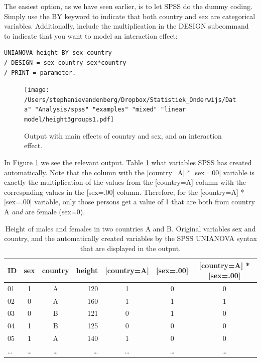 \documentclass[]{report}\usepackage[]{graphicx}\usepackage[]{color}
\begin{document}
The easiest option, as we have seen earlier, is to let SPSS do the dummy coding. Simply use the BY keyword to indicate that both country and sex are categorical variables. Additionally, include the multiplication in the DESIGN subcommand to indicate that you want to model an interaction effect:

\begin{verbatim}
UNIANOVA height BY sex country 
/ DESIGN = sex country sex*country
/ PRINT = parameter.
\end{verbatim}


\begin{figure}[h]
    \begin{center}
       \texttt{[image: /Users/stephanievandenberg/Dropbox/Statistiek\_Onderwijs/Data" "Analysis/spss" "examples" "mixed" "linear model/height3groups1.pdf]}
    \end{center}
    \label{fig:interactionheightcountrysex}
    \caption{Output with main effects of country and sex, and an interaction effect.}
\end{figure}

In Figure \ref{fig:interactionheightcountrysex} we see the relevant output. Table \ref{tab:2countries} what variables SPSS has created automatically. Note that the column with the [country=A] * [sex=.00] variable is exactly the multiplication of the values from the [country=A] column with the correspnding values in the [sex=.00] column. Therefore, for the [country=A] * [sex=.00] variable, only those persons get a value of 1 that are both from country A \textit{and} are female (sex=0). 


\begin{table}
 \caption{Height of males and females in two countries A and B. Original variables sex and country, and the automatically created variables by the SPSS UNIANOVA syntax that are displayed in the output.}
 \begin{tabular}{lccrccc}
 ID & sex & country & height &  [country=A] & [sex=.00] &[country=A] * [sex=.00]      \\ \hline
 01 & 1 & A & 120 &  1 &0 & 0         \\
 02 & 0 & A & 160 &   1&1 & 1        \\
 03 & 0 & B & 121 &  0 &1& 0       \\
 04 & 1 & B & 125 &  0 &0 &0          \\
 05 & 1 & A & 140 &  1 &0 & 0       \\
 \dots & \dots & \dots & \dots &\dots   & \dots&  \dots       \\
 \end{tabular}
 \label{tab:2countries}
 \end{table}
\end{document}
